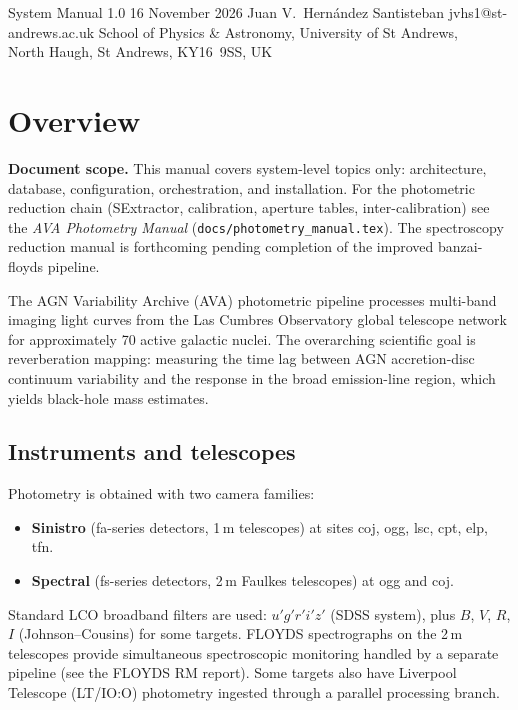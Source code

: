 \documentclass[12pt,a4paper]{article}
\begin{document}

\avatitlepage
  {System Manual}
  {1.0}
  {16 November 2026}
  {Juan V.\ Hern\'{a}ndez Santisteban}
  {jvhs1@st-andrews.ac.uk}
  {School of Physics \& Astronomy, University of St Andrews,\\
   North Haugh, St Andrews, KY16~9SS, UK}

\tableofcontents
\clearpage


\section{Overview}

\begin{notebox}
\textbf{Document scope.}  This manual covers system-level topics only:
architecture, database, configuration, orchestration, and installation.
For the photometric reduction chain (SExtractor, calibration, aperture
tables, inter-calibration) see the \emph{AVA Photometry Manual}
(\texttt{docs/photometry\_manual.tex}).  The spectroscopy reduction
manual is forthcoming pending completion of the improved banzai-floyds
pipeline.
\end{notebox}

\label{sec:overview}

The AGN Variability Archive (AVA) photometric pipeline processes multi-band imaging light
curves from the Las Cumbres Observatory global telescope network for approximately 70 active
galactic nuclei.  The overarching scientific goal is reverberation mapping: measuring the
time lag between AGN accretion-disc continuum variability and the response in the broad
emission-line region, which yields black-hole mass estimates.

\subsection{Instruments and telescopes}

Photometry is obtained with two camera families:
\begin{itemize}
  \item \textbf{Sinistro} (fa-series detectors, 1\,m telescopes) at sites coj, ogg, lsc,
        cpt, elp, tfn.
  \item \textbf{Spectral} (fs-series detectors, 2\,m Faulkes telescopes) at ogg and coj.
\end{itemize}
Standard LCO broadband filters are used: $u'g'r'i'z'$ (SDSS system), plus $B$, $V$, $R$,
$I$ (Johnson--Cousins) for some targets.  FLOYDS spectrographs on the 2\,m telescopes
provide simultaneous spectroscopic monitoring handled by a separate pipeline
(see the FLOYDS RM report).  Some targets also have Liverpool Telescope (LT/IO:O)
photometry ingested through a parallel processing branch.
\end{document}
